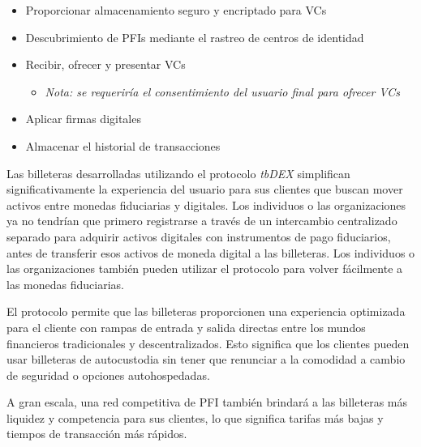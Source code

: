 \documentclass[11pt]{article}
\begin{document}
\begin{itemize}
	\item Proporcionar almacenamiento seguro y encriptado para VCs

	\item Descubrimiento de PFIs mediante el rastreo de centros de identidad

	\item Recibir, ofrecer y presentar VCs

\begin{itemize}
	\item \textit{Nota: se requeriría el consentimiento del usuario final para ofrecer VCs}

\end{itemize}
	\item Aplicar firmas digitales

	\item Almacenar el historial de transacciones

\vspace{1\baselineskip}
\end{itemize}
Las billeteras desarrolladas utilizando el protocolo \textit{tbDEX} simplifican significativamente la experiencia del usuario para sus clientes que buscan mover activos entre monedas fiduciarias y digitales. Los individuos o las organizaciones ya no tendrían que primero registrarse a través de un intercambio centralizado separado para adquirir activos digitales con instrumentos de pago fiduciarios, antes de transferir esos activos de moneda digital a las billeteras. Los individuos o las organizaciones también pueden utilizar el protocolo para volver fácilmente a las monedas fiduciarias.

\vspace{1\baselineskip}
El protocolo permite que las billeteras proporcionen una experiencia optimizada para el cliente con rampas de entrada y salida directas entre los mundos financieros tradicionales y descentralizados. Esto significa que los clientes pueden usar billeteras de autocustodia sin tener que renunciar a la comodidad a cambio de seguridad o opciones autohospedadas.

\vspace{1\baselineskip}
A gran escala, una red competitiva de PFI también brindará a las billeteras más liquidez y competencia para sus clientes, lo que significa tarifas más bajas y tiempos de transacción más rápidos.
\end{document}
